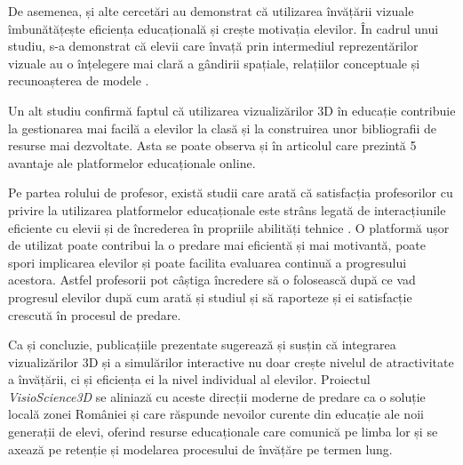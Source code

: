 De asemenea, și alte cercetări au demonstrat că utilizarea învățării vizuale îmbunătățește eficiența
educațională și crește motivația elevilor. În cadrul unui studiu, s-a demonstrat că elevii
care învață prin intermediul reprezentărilor vizuale au o înțelegere mai clară a gândirii spațiale,
relațiilor conceptuale și recunoașterea de modele \cite{study10}.

Un alt studiu confirmă faptul că utilizarea vizualizărilor 3D în educație 
contribuie la gestionarea mai facilă a elevilor la clasă și la construirea unor bibliografii de 
resurse mai dezvoltate. Asta se poate observa și în articolul \cite{study12} care prezintă
5 avantaje ale platformelor educaționale online.

Pe partea rolului de profesor, există studii care arată că satisfacția profesorilor cu privire
la utilizarea platformelor educaționale este strâns legată de interacțiunile eficiente
cu elevii și de încrederea în propriile abilități tehnice \cite{study11}. O platformă ușor de
utilizat poate contribui la o predare
mai eficientă și mai motivantă, poate spori implicarea elevilor și poate facilita evaluarea
continuă a progresului acestora. Astfel profesorii pot câștiga încredere să o folosească după ce vad
progresul elevilor după cum arată și studiul \cite{study11} și să raporteze și ei satisfacție 
crescută în procesul de predare.

Ca și concluzie, publicațiile prezentate sugerează și susțin că integrarea vizualizărilor 3D și a simulărilor
interactive nu doar crește nivelul de atractivitate a învățării, ci și eficiența ei la nivel individual al elevilor.
Proiectul \textit{VisioScience3D} se aliniază cu aceste direcții moderne de predare ca o soluție locală zonei
României și care răspunde nevoilor curente din educație ale noii generații de elevi, oferind resurse educaționale
care comunică pe limba lor și se axează pe retenție și modelarea procesului de învățăre pe termen lung.



